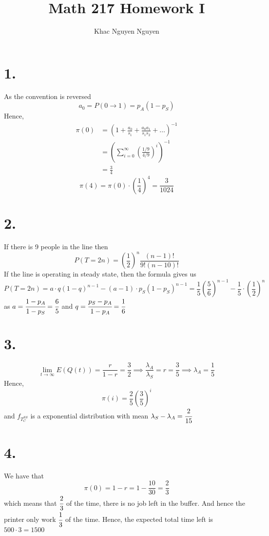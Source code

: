 \documentclass[11pt]{article}
\title{\textbf{Math 217 Homework I}}
\author{Khac Nguyen Nguyen}
\date{}
\begin{document}
\section*{1.}
As the convention is reversed
\[
    a_0 = P(0 \to 1) = p_A(1-p_S)     
\]
Hence,
\begin{equation*}
    \begin{aligned}
        \pi(0) 
        &= \left(1 + \frac{a_0}{s_1} +  \frac{a_0 a_1}{s_1 s_2} + \ldots \right)^{-1} \\
        &= \left(\sum_{i=0}^\infty \left(\frac{1/9}{4/9}\right)^i \right)^{-1} \\
        &= \frac{3}{4}
    \end{aligned}
\end{equation*}
\[
    \pi(4) = \pi(0) \cdot \left(\frac{1}{4}\right)^4 = \frac{3}{1024}    
\]
\pagebreak
\section*{2.}
If there is 9 people in the line then 
\[
    P(T=2n) = \left(\frac{1}{2}\right)^n \frac{(n-1)!}{9!(n-10)!}    
\]
If the line is operating in steady state, then the formula gives us 
\[
    P(T=2n) = a \cdot q(1-q)^{n-1} - (a-1)\cdot p_S(1-p_S)^{n-1} 
    = \frac{1}{5} \left(\frac{5}{6}\right)^{n-1} - \frac{1}{5} \cdot \left(\frac{1}{2}\right)^n
\]
as $a=\cfrac{1-p_A}{1-p_S} = \cfrac{6}{5}$ and $q = \cfrac{p_S-p_A}{1-p_A} = \cfrac{1}{6}$
\pagebreak
\section*{3.}
\[
    \lim_{t \to \infty} E(Q(t)) = \frac{r}{1-r} = \frac{3}{2} \implies \frac{\lambda_A}{\lambda_S} = r=\frac{3}{5} \implies \lambda_A = \frac{1}{5}   
\]
Hence, 
\[
    \pi(i) = \frac{2}{5} \left(\frac{3}{5}\right)^i    
\]
and $f_{T_C^{SS}}$ is a exponential distribution with mean $\lambda_S - \lambda_A = \cfrac{2}{15}$
\pagebreak
\section*{4.}
We have that 
\[
    \pi(0) = 1-r = 1-\frac{10}{30} = \frac{2}{3}
\]
which means that $\cfrac{2}{3}$ of the time, there is no job left in the buffer. And hence the 
printer only work $\cfrac{1}{3}$ of the time. Hence, the expected total time left is $500 \cdot 3 = 1500$
\end{document}

